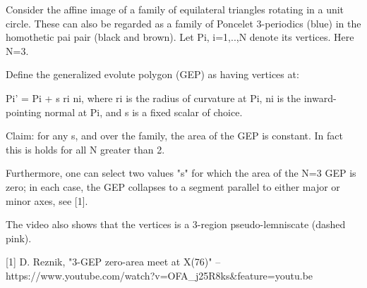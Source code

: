 Consider the affine image of a family of equilateral triangles rotating in a unit circle. These can also be regarded as a  family of Poncelet 3-periodics (blue) in the homothetic pai pair (black and brown). Let Pi, i=1,..,N denote its vertices. Here N=3.

Define the generalized evolute polygon (GEP) as having vertices at:

Pi' = Pi + s ri ni, where ri is the radius of curvature at Pi, ni is the inward-pointing normal at Pi, and s is a fixed scalar of choice.

Claim: for any s, and over the family, the area of the GEP is constant. In fact this is holds for all N greater than 2.

Furthermore, one can select two values "s" for which the area of the N=3 GEP is zero; in each case, the GEP collapses to a segment parallel to either major or minor axes, see [1].

The video also shows that the vertices is a 3-region pseudo-lemniscate (dashed pink).

[1] D. Reznik, "3-GEP zero-area meet at X(76)" -- https://www.youtube.com/watch?v=OFA_j25R8ks&feature=youtu.be